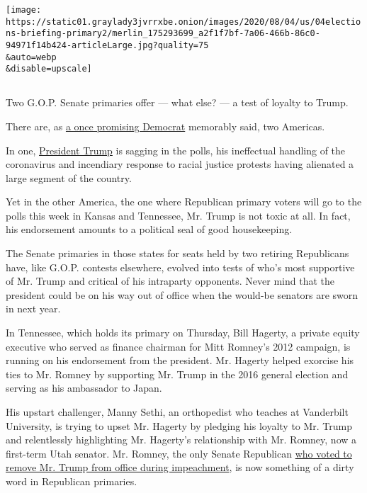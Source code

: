 \texttt{[image: https://static01.graylady3jvrrxbe.onion/images/2020/08/04/us/04elections-briefing-primary2/merlin\_175293699\_a2f1f7bf-7a06-466b-86c0-94971f14b424-articleLarge.jpg?quality=75\\\&auto=webp\\\&disable=upscale]}

\subsection{}

Two G.O.P. Senate primaries offer --- what else? --- a test of loyalty
to Trump.

There are, as
\href{https://www.nytimes3xbfgragh.onion/2004/07/27/politics/campaign/senator-john-edwardss-remarks-to-the-democratic-national.html}{a
once promising Democrat} memorably said, two Americas.

In one,
\href{https://www.nytimes3xbfgragh.onion/interactive/2020/us/elections/donald-trump.html}{President
Trump} is sagging in the polls, his ineffectual handling of the
coronavirus and incendiary response to racial justice protests having
alienated a large segment of the country.

Yet in the other America, the one where Republican primary voters will
go to the polls this week in Kansas and Tennessee, Mr. Trump is not
toxic at all. In fact, his endorsement amounts to a political seal of
good housekeeping.

The Senate primaries in those states for seats held by two retiring
Republicans have, like G.O.P. contests elsewhere, evolved into tests of
who's most supportive of Mr. Trump and critical of his intraparty
opponents. Never mind that the president could be on his way out of
office when the would-be senators are sworn in next year.

In Tennessee, which holds its primary on Thursday, Bill Hagerty, a
private equity executive who served as finance chairman for Mitt
Romney's 2012 campaign, is running on his endorsement from the
president. Mr. Hagerty helped exorcise his ties to Mr. Romney by
supporting Mr. Trump in the 2016 general election and serving as his
ambassador to Japan.

His upstart challenger, Manny Sethi, an orthopedist who teaches at
Vanderbilt University, is trying to upset Mr. Hagerty by pledging his
loyalty to Mr. Trump and relentlessly highlighting Mr. Hagerty's
relationship with Mr. Romney, now a first-term Utah senator. Mr. Romney,
the only Senate Republican
\href{https://www.nytimes3xbfgragh.onion/2020/02/05/us/politics/romney-trump-impeachment.html}{who
voted to remove Mr. Trump from office during impeachment}, is now
something of a dirty word in Republican primaries.

